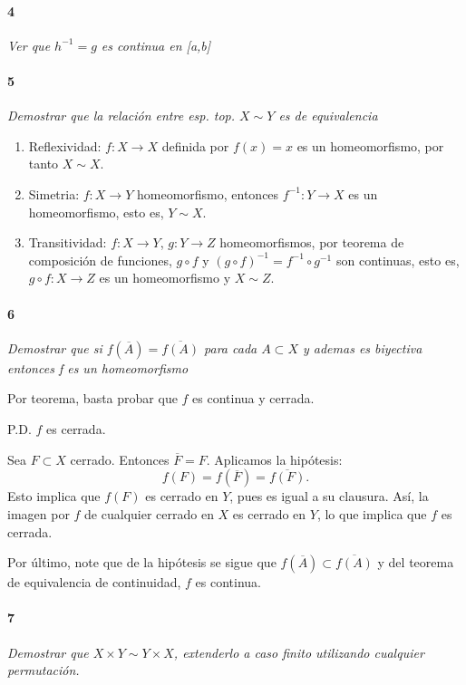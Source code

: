 \documentclass[12pt]{article}
\begin{document}
\paragraph{4}
\textit{Ver que $h^{-1}=g$ es continua en [a,b]}

\paragraph{5}
\textit{Demostrar que la relación entre esp. top. $X\sim Y$ es de equivalencia}

\begin{enumerate}
    \item Reflexividad: $f:X \to X$ definida por $f(x)=x$ es un homeomorfismo, por tanto $X \sim X$.
    \item Simetria: $f:X \to Y$ homeomorfismo, entonces $f^{-1}: Y \to X$ es un homeomorfismo, esto es, $Y \sim X$.
    \item Transitividad: $f:X \to Y$, $g:Y\to Z$ homeomorfismos, por teorema de composición de funciones, $g\circ f$ y $(g\circ f)^{-1}=f^{-1}\circ g^{-1}$ son continuas, esto es, $g\circ f:X \to Z$ es un homeomorfismo y $X \sim Z$.
\end{enumerate}
\paragraph{6}
\textit{Demostrar que si $f(\overline{A})=\overline{f(A)}$ para cada $A\subset X$ y ademas es biyectiva entonces f es un homeomorfismo}

Por teorema, basta probar que \( f \) es continua y cerrada.

P.D. \( f \) es cerrada.

Sea \( F \subset X \) cerrado. Entonces \( \overline{F} = F \). Aplicamos la hipótesis:
\[
f(F) = f(\overline{F}) = \overline{f(F)}.
\]
Esto implica que \( f(F) \) es cerrado en \( Y \), pues es igual a su clausura.  
Así, la imagen por \( f \) de cualquier cerrado en \( X \) es cerrado en \( Y \),  
lo que implica que \( f \) es cerrada.

Por último, note que de la hipótesis se sigue que $f(\overline{A}) \subset \overline{f(A)}$ y del teorema de equivalencia de continuidad, $f$ es continua.

\paragraph{7}
\textit{Demostrar que $X\times Y \sim Y \times X$, extenderlo a caso finito utilizando cualquier permutación.}
\end{document}
